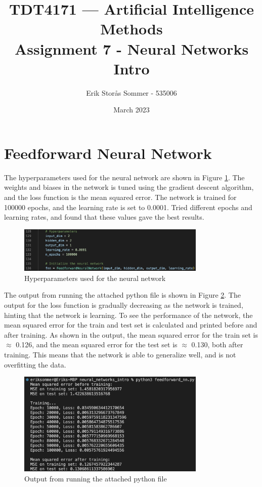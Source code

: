 \documentclass{article}
\title{TDT4171 — Artificial Intelligence Methods \\ Assignment 7 - Neural Networks Intro}
\author{Erik Storås Sommer - 535006}
\date{March 2023}
\begin{document}
\maketitle
\setlength{\parindent}{0pt}

\section*{Feedforward Neural Network}

The hyperparameters used for the neural network are shown in Figure \ref{fig:image1}.
The weights and biases in the network is tuned using the gradient descent algorithm, and the loss function is the mean squared error.
The network is trained for 100000 epochs, and the learning rate is set to 0.0001.
Tried different epochs and learning rates, and found that these values gave the best results.

\begin{figure}[hbtp]
    \centering
    \includegraphics[width=0.8\textwidth]{images/hyperparameters.png}
    \caption{Hyperparameters used for the neural network}
    \label{fig:image1}
\end{figure}

The output from running the attached python file is shown in Figure \ref{fig:image2}.
The output for the loss function is gradually decreasing as the network is trained, hinting that the network is learning.
To see the performance of the network, the mean squared error for the train and test set is calculated and printed before and after training.
As shown in the output, the mean squared error for the train set is $\approx$ 0.126, and the mean squared error for the test set is $\approx$ 0.130, both after training.
This means that the network is able to generalize well, and is not overfitting the data.

\begin{figure}[hbtp]
    \centering
    \includegraphics[width=0.8\textwidth]{images/output.png}
    \caption{Output from running the attached python file}
    \label{fig:image2}
\end{figure}
\end{document}
